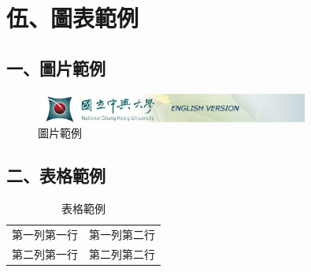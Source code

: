 \chapter{伍、圖表範例}
\section{一、圖片範例}
\begin{figure}[h]
    \begin{center}
        \includegraphics[bb=0 0 527 56,width=0.8\textwidth]{NCHU_Logo.jpg}
    \end{center}
    \caption{圖片範例}
\end{figure}

\section{二、表格範例}
\begin{table}[h]
    \caption{表格範例}
    \begin{center}
        \begin{tabular}{|c|c|}
        \hline
        第一列第一行 & 第一列第二行 \\
        第二列第一行 & 第二列第二行 \\
        \hline
        \end{tabular}
    \end{center}
\end{table}
